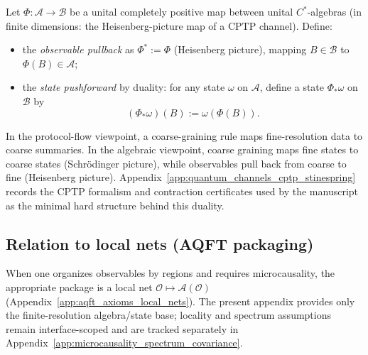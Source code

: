 \begin{definition}\label{def:state_pushforward_observable_pullback}
\MathTag Let $\Phi:\mathcal{A}\to\mathcal{B}$ be a unital completely positive map between unital $C^\ast$-algebras (in finite dimensions: the Heisenberg-picture map of a CPTP channel).
Define:
\begin{itemize}
\item the \emph{observable pullback} as $\Phi^\ast:=\Phi$ (Heisenberg picture), mapping $B\in\mathcal{B}$ to $\Phi(B)\in\mathcal{A}$;
\item the \emph{state pushforward} by duality:
for any state $\omega$ on $\mathcal{A}$, define a state $\Phi_\ast\omega$ on $\mathcal{B}$ by
\[
(\Phi_\ast\omega)(B):=\omega(\Phi(B)).
\]
\end{itemize}
\end{definition}

\begin{remark}\label{rem:channel_matches_protocol_flow}
\InterfaceTag In the protocol-flow viewpoint, a coarse-graining rule maps fine-resolution data to coarse summaries.
In the algebraic viewpoint, coarse graining maps fine states to coarse states (Schr\"odinger picture), while observables pull back from coarse to fine (Heisenberg picture).
Appendix~\ref{app:quantum_channels_cptp_stinespring} records the CPTP formalism and contraction certificates used by the manuscript as the minimal hard structure behind this duality.
\end{remark}

\subsection{Relation to local nets (AQFT packaging)}

\AuditTag When one organizes observables by regions and requires microcausality, the appropriate package is a local net $\mathcal{O}\mapsto\mathcal{A}(\mathcal{O})$ (Appendix~\ref{app:aqft_axioms_local_nets}).
The present appendix provides only the finite-resolution algebra/state base; locality and spectrum assumptions remain interface-scoped and are tracked separately in Appendix~\ref{app:microcausality_spectrum_covariance}.

